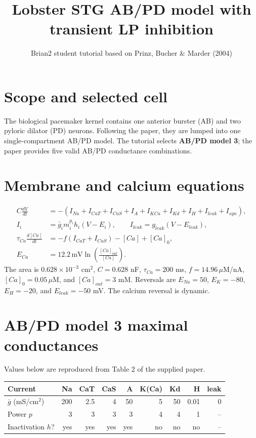 \documentclass[10pt,a4paper]{article}
\title{Lobster STG AB/PD model with transient LP inhibition}
\author{Brian2 student tutorial based on Prinz, Bucher \& Marder (2004)}
\date{}
\begin{document}
\maketitle

\section*{Scope and selected cell}
The biological pacemaker kernel contains one anterior burster (AB) and two
pyloric dilator (PD) neurons. Following the paper, they are lumped into one
single-compartment AB/PD model. The tutorial selects \textbf{AB/PD model 3};
the paper provides five valid AB/PD conductance combinations.

\section*{Membrane and calcium equations}
\begin{align}
C\frac{dV}{dt}&=-\left(I_{Na}+I_{CaT}+I_{CaS}+I_A+I_{KCa}+I_{Kd}
+I_H+I_{leak}+I_{syn}\right),\\
I_i&=\bar g_i m_i^{p_i}h_i(V-E_i),\qquad
I_{leak}=g_{leak}(V-E_{leak}),\\
\tau_{Ca}\frac{d[Ca]}{dt}&=-f(I_{CaT}+I_{CaS})-[Ca]+[Ca]_0,\\
E_{Ca}&=12.2\,\mathrm{mV}\ln\!\left(\frac{[Ca]_{out}}{[Ca]}\right).
\end{align}
The area is $0.628\times10^{-3}$ cm$^2$, $C=0.628$ nF,
$\tau_{Ca}=200$ ms, $f=14.96\,\mu$M/nA, $[Ca]_0=0.05\,\mu$M, and
$[Ca]_{out}=3$ mM. Reversals are $E_{Na}=50$, $E_K=-80$, $E_H=-20$, and
$E_{leak}=-50$ mV. The calcium reversal is dynamic.

\section*{AB/PD model 3 maximal conductances}
Values below are reproduced from Table 2 of the supplied paper.
\begin{center}
\begin{tabular}{lrrrrrrrr}
\toprule
Current & Na & CaT & CaS & A & K(Ca) & Kd & H & leak\\
\midrule
$\bar g$ (mS/cm$^2$) & 200 & 2.5 & 4 & 50 & 5 & 50 & 0.01 & 0\\
Power $p$ & 3 & 3 & 3 & 3 & 4 & 4 & 1 & --\\
Inactivation $h$? & yes & yes & yes & yes & no & no & no & --\\
\bottomrule
\end{tabular}
\end{center}
\end{document}
